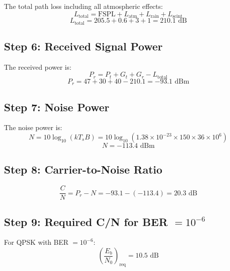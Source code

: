 The total path loss including all atmospheric effects:
\begin{equation}
L_{\text{total}} = \text{FSPL} + L_{\text{atm}} + L_{\text{rain}} + L_{\text{scint}}
\end{equation}
\begin{equation}
L_{\text{total}} = 205.5 + 0.6 + 3 + 1 = 210.1\text{~dB}
\end{equation}

\subsection*{Step 6: Received Signal Power}

The received power is:
\begin{equation}
P_r = P_t + G_t + G_r - L_{\text{total}}
\end{equation}
\begin{equation}
P_r = 47 + 30 + 40 - 210.1 = -93.1\text{~dBm}
\end{equation}

\subsection*{Step 7: Noise Power}

The noise power is:
\begin{equation}
N = 10\log_{10}(kT_sB) = 10\log_{10}(1.38 \times 10^{-23} \times 150 \times 36 \times 10^6)
\end{equation}
\begin{equation}
N = -113.4\text{~dBm}
\end{equation}

\subsection*{Step 8: Carrier-to-Noise Ratio}

\begin{equation}
\frac{C}{N} = P_r - N = -93.1 - (-113.4) = 20.3\text{~dB}
\end{equation}

\subsection*{Step 9: Required C/N for BER $= 10^{-6}$}

For QPSK with BER $= 10^{-6}$:
\begin{equation}
\left(\frac{E_b}{N_0}\right)_{\text{req}} = 10.5\text{~dB}
\end{equation}

